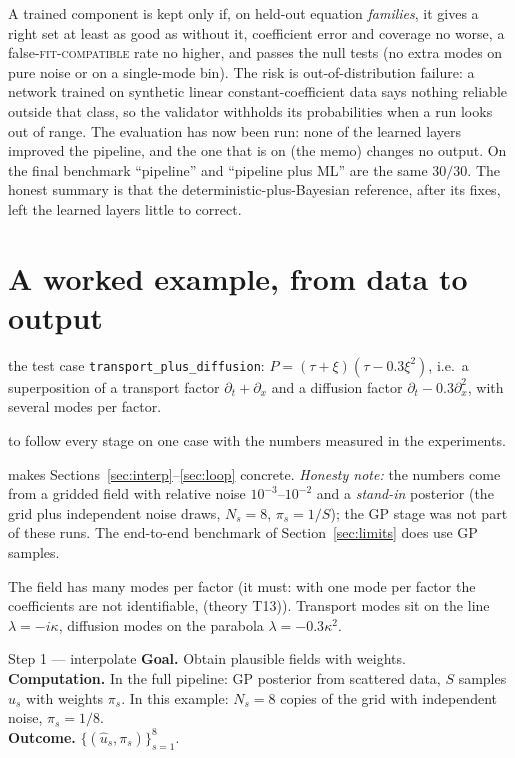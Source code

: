 \documentclass[11pt,a4paper]{article}
\theoremstyle{definition}
\newcommand{\sectionbrief}[3]{\begin{leadin}\begin{description}[nosep,leftmargin=3.0cm,labelwidth=2.8cm]
  \item[Starting from] #1
  \item[Why this section] #2
  \item[Role in the paper] #3
  \end{description}\end{leadin}}
\newcommand{\thy}[1]{\textcolor{cG}{\textsf{\footnotesize(theory #1)}}}
\begin{document}
\begin{caution}[title=Acceptance rule and the risk]
A trained component is kept only if, on held-out equation \emph{families}, it gives a right set at least as good as without it, coefficient error and coverage no worse, a false-\textsc{fit-compatible} rate no higher, and passes the null tests (no extra modes on pure noise or on a single-mode bin). The risk is out-of-distribution failure: a network trained on synthetic linear constant-coefficient data says nothing reliable outside that class, so the validator withholds its probabilities when a run looks out of range. The evaluation has now been run: none of the learned layers improved the pipeline, and the one that is on (the memo) changes no output. On the final benchmark ``pipeline'' and ``pipeline plus ML'' are the same $30/30$. The honest summary is that the deterministic-plus-Bayesian reference, after its fixes, left the learned layers little to correct.
\end{caution}



\section{A worked example, from data to output}\label{sec:example}
\sectionbrief
{the test case \texttt{transport\_plus\_diffusion}: $P=(\tau+\xi)(\tau-0.3\xi^2)$, i.e.\ a superposition of a transport factor $\partial_t+\partial_x$ and a diffusion factor $\partial_t-0.3\partial_x^2$, with several modes per factor.}
{to follow every stage on one case with the numbers measured in the experiments.}
{makes Sections~\ref{sec:interp}--\ref{sec:loop} concrete. \emph{Honesty note:} the numbers come from a gridded field with relative noise $10^{-3}$--$10^{-2}$ and a \emph{stand-in} posterior (the grid plus independent noise draws, $N_s=8$, $\pi_s=1/S$); the GP stage was not part of these runs. The end-to-end benchmark of Section~\ref{sec:limits} does use GP samples.}

The field has many modes per factor (it must: with one mode per factor the coefficients are not identifiable, \thy{T13}). Transport modes sit on the line $\lambda=-i\kappa$, diffusion modes on the parabola $\lambda=-0.3\kappa^2$.

\begin{wstep}{Step 1 --- interpolate}
\textbf{Goal.} Obtain plausible fields with weights.\\
\textbf{Computation.} In the full pipeline: GP posterior from scattered data, $S$ samples $\hat u_s$ with weights $\pi_s$. In this example: $N_s=8$ copies of the grid with independent noise, $\pi_s=1/8$.\\
\textbf{Outcome.} $\{(\hat u_s,\pi_s)\}_{s=1}^8$.
\end{wstep}
\end{document}
